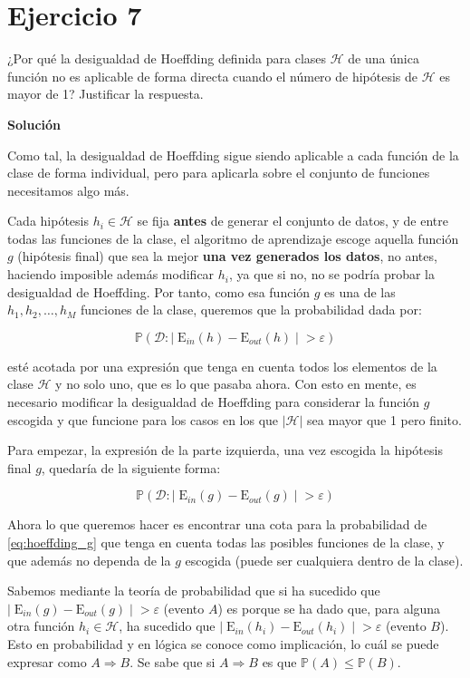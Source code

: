 \documentclass[11pt,a4paper]{article}
\newcommand{\answer}{\noindent\textbf{Solución}}
\newcommand{\addtoc}[1]{\addcontentsline{toc}{section}{#1}}
\begin{document}
\section*{Ejercicio 7}
\addtoc{Ejercicio 7}

\noindent ¿Por qué la desigualdad de Hoeffding definida para clases $\mathcal{H}$ de una única función no es aplicable de
forma directa cuando el número de hipótesis de $\mathcal{H}$ es mayor de 1? Justificar la respuesta.

\answer

Como tal, la desigualdad de Hoeffding sigue siendo aplicable a cada función de la clase de forma individual, pero para 
aplicarla sobre el conjunto de funciones necesitamos algo más. 

Cada hipótesis $h_i \in \mathcal{H}$ se fija \textbf{antes} de generar el conjunto de datos,
y de entre todas las funciones de la clase, el algoritmo de aprendizaje escoge aquella función $g$ (hipótesis final)
que sea la mejor \textbf{una vez generados los datos}, no antes, haciendo imposible además modificar $h_i$, ya que si no, 
no se podría probar la desigualdad de Hoeffding.
Por tanto, como esa función $g$ es una de las $h_1, h_2, \dots, h_M$ funciones de la clase, queremos que la probabilidad
dada por:

\[ \mathbb{P}(\mathcal{D}: | \; \text{E}_{in}(h) - \text{E}_{out}(h) \; | \; > \varepsilon)\]

\noindent esté acotada por una expresión que tenga en cuenta todos los elementos de la clase $\mathcal{H}$
y no solo uno, que es lo que pasaba ahora. Con esto en mente, es necesario modificar la desigualdad de Hoeffding para
considerar la función $g$ escogida y que funcione para los casos en los que $|\mathcal{H}|$ sea mayor que 1 pero finito.

Para empezar, la expresión de la parte izquierda, una vez escogida la hipótesis final $g$, quedaría de la siguiente forma:

\begin{equation}
\label{eq:hoeffding_g}
	\mathbb{P}(\mathcal{D}: | \; \text{E}_{in}(g) - \text{E}_{out}(g) \; | \; > \varepsilon)
\end{equation}

Ahora lo que queremos hacer es encontrar una cota para la probabilidad de \eqref{eq:hoeffding_g} que tenga en cuenta todas
las posibles funciones de la clase, y que además no dependa de la $g$ escogida (puede ser cualquiera dentro de la clase).

Sabemos mediante la teoría de probabilidad que si ha sucedido que
$| \; \text{E}_{in}(g) - \text{E}_{out}(g) \; | \; > \varepsilon$ (evento $A$) es porque se ha dado que, para alguna otra
función $h_i \in \mathcal{H}$, ha sucedido que $| \; \text{E}_{in}(h_i) - \text{E}_{out}(h_i) \; | \; > \varepsilon$
(evento $B$). Esto en probabilidad y en lógica se conoce como implicación, lo cuál se puede expresar como $A \Rightarrow B$.
Se sabe que si $A \Rightarrow B$ es que $\mathbb{P}(A) \leq \mathbb{P}(B)$.
\end{document}

